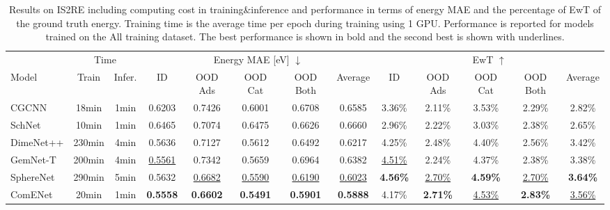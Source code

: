 \documentclass{article}
\begin{document}
\begin{table*}[t]
    \begin{center}
\caption{Results on IS2RE including computing cost in training\&inference
        and performance in terms of
        energy MAE and the percentage of EwT of the ground truth energy. 
        Training time is the average time per epoch during training using 1 GPU.
        Performance is reported for models trained on the All training dataset.
        The best performance is shown in bold and the second best is shown with underlines.
        }
\label{tb:result_oc20}
    \resizebox{\textwidth}{!}
    {\begin{tabular}{l cc | ccccc | ccccc  }
    \toprule
    & \multicolumn{2}{c|}{Time } &\multicolumn{5}{c|}{Energy MAE [eV] $\downarrow$} & \multicolumn{5}{c}{EwT $\uparrow$}  \\
    \cmidrule(l{4pt}r{4pt}){2-3}
    \cmidrule(l{4pt}r{4pt}){4-8}
    \cmidrule(l{4pt}r{4pt}){9-13}
 Model &Train &Infer. & ID &  OOD Ads & OOD Cat & OOD Both &Average& ID &  OOD Ads & OOD Cat & OOD Both &Average\\
\midrule
CGCNN &18min &1min &0.6203 &0.7426 &0.6001 &0.6708 &0.6585 &3.36\% &2.11\% &3.53\% &2.29\% &2.82\% \\
SchNet &10min &1min &0.6465 &0.7074 &0.6475 &0.6626 &0.6660 &2.96\% &2.22\% &3.03\% &2.38\% &2.65\% \\
DimeNet++ &230min &4min &0.5636 &0.7127 &0.5612 &0.6492 &0.6217 &4.25\% &2.48\% &4.40\% &2.56\% &3.42\% \\
GemNet-T &200min &4min &\underline{0.5561} &0.7342 &0.5659 &0.6964 &0.6382 &\underline{4.51\%} &2.24\% &4.37\% &2.38\% &3.38\% \\
SphereNet &290min &5min &0.5632 &\underline{0.6682} &\underline{0.5590} &\underline{0.6190} &\underline{0.6023} &\textbf{4.56\%} &\underline{2.70\%} &\textbf{4.59\%} &\underline{2.70\%} &\textbf{3.64\%} \\
ComENet &20min &1min &\textbf{0.5558} &\textbf{0.6602} &\textbf{0.5491} &\textbf{0.5901} &\textbf{0.5888} &4.17\% &\textbf{2.71\%} &\underline{4.53\%} &\textbf{2.83\%} &\underline{3.56\%} \\
\bottomrule
\end{tabular}}
\end{center}
\end{table*}
\end{document}
